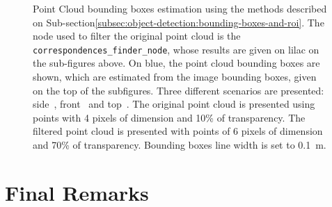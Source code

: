 \begin{figure}[ht!]
\begin{subfigure}[c]{0.8\textwidth}
		\label{fig:bboxes-3d-kitti-top}
	\end{subfigure}
	\caption{Point Cloud bounding boxes estimation using the methods described on Sub-section\ref{subsec:object-detection:bounding-boxes-and-roi}. The node used to filter the original point cloud is the \texttt{correspondences\_finder\_node}, whose results are given on lilac on the sub-figures above. On blue, the point cloud bounding boxes are shown, which are estimated from the image bounding boxes, given on the top of the subfigures. Three different scenarios are presented: side~, front~ and top~. The original point cloud is presented using points with 4 pixels of dimension and 10\% of transparency. The filtered point cloud is presented with points of 6 pixels of dimension and 70\% of transparency. Bounding boxes line width is set to \SI{0.1}{\meter}.} 
	\label{fig:bboxes-3d-kitti}
\end{figure}



\section{Final Remarks}









